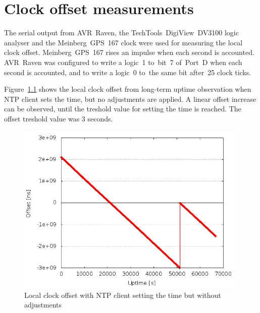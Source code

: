 \chapter{Clock offset measurements}\label{app:offset}
The serial output from AVR~Raven,
the TechTools~DigiView~DV3100 logic analyser and the Meinberg~GPS~167 clock
were used for measuring the local clock offset.
Meinberg~GPS~167 rises an impulse when each second is accounted.
AVR~Raven was configured to write a logic~1
to~bit~7 of~Port~D when each second is accounted,
and to write a logic~0 to~the same bit after~25 clock ticks.

Figure~\ref{fig:app-ntp-set-time} shows the local clock offset from long-term uptime
observation when NTP client sets the time, but no adjustments are applied.
A linear offset increase can be observed, until the treshold value
for setting the time is reached.
The offset treshold value was 3 seconds.
\begin{figure}[H]
  \centering
  \includegraphics[width=11cm,keepaspectratio]{fig/set-time-3s.png}
  \caption{Local clock offset with NTP client setting the time but without adjustments}
  \label{fig:app-ntp-set-time}
\end{figure}

